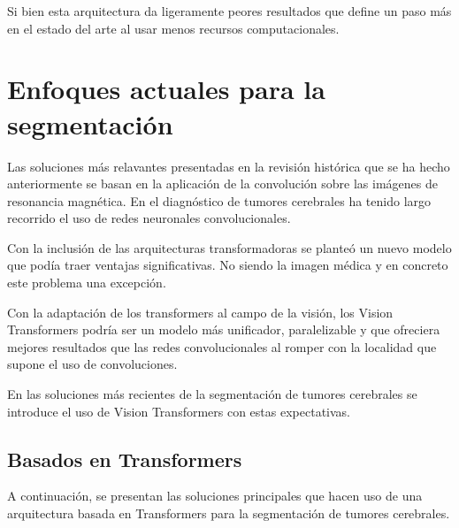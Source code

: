 		Si bien esta arquitectura da ligeramente peores resultados que \cite{myronenko20193d} define un paso más en el estado del arte al usar menos recursos computacionales.


\section{Enfoques actuales para la segmentación}

	Las soluciones más relavantes presentadas en la revisión histórica que se ha hecho anteriormente se basan en la aplicación de la convolución sobre las imágenes de resonancia magnética. En el diagnóstico de tumores cerebrales ha tenido largo recorrido el uso de redes neuronales convolucionales. 
	
	Con la inclusión de las arquitecturas transformadoras se planteó un nuevo modelo que podía traer ventajas significativas. No siendo la imagen médica y en concreto este problema una excepción.
	
	Con la adaptación de los transformers al campo de la visión, los Vision Transformers podría ser un modelo más unificador, paralelizable y que ofreciera mejores resultados que las redes convolucionales al romper con la localidad que supone el uso de convoluciones. 
	
	En las soluciones más recientes de la segmentación de tumores cerebrales se introduce el uso de Vision Transformers con estas expectativas.
	
	\subsection{Basados en Transformers}
	
	A continuación, se presentan las soluciones principales que hacen uso de una arquitectura basada en Transformers para la segmentación de tumores cerebrales.
	
		\subsubsection{}
